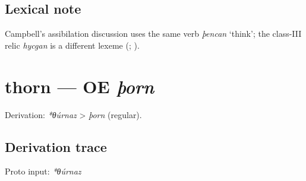 \documentclass[
  british,
  a4paper,
  openany]{book}
\providecommand{\texorpdfstring}[2]{#1}
\begin{document}
\subsection{Lexical note}\label{lexical-note}

Campbell's assibilation discussion uses the same verb \emph{þencan}
`think'; the class-III relic \emph{hycgan} is a different lexeme
(;
).

\section{\texorpdfstring{thorn --- OE
\emph{þorn}}{thorn --- OE þorn}}\label{thorn-oe-uxfeorn}


Derivation: \emph{*θúrnaz} \textgreater{} \emph{þorn} (regular).

\subsection{Derivation trace}\label{derivation-trace-56}

Proto input: \emph{*θúrnaz}

\begingroup
\setlength{\fboxsep}{6pt}
\end{document}
